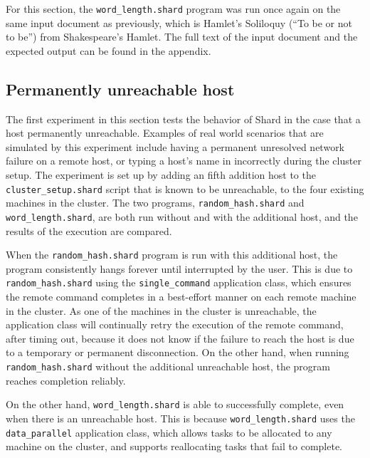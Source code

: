 \documentclass[oneside]{report}
\begin{document}
For this section, the \texttt{word\_length.shard} program was run once again on the same input document as previously, which is Hamlet's Soliloquy (``To be or not to be'') from Shakespeare's Hamlet.
The full text of the input document and the expected output can be found in the appendix.

\subsection{Permanently unreachable host}
The first experiment in this section tests the behavior of Shard in the case that a host permanently unreachable.
Examples of real world scenarios that are simulated by this experiment include having a permanent unresolved network failure on a remote host, or typing a host's name in incorrectly during the cluster setup.
The experiment is set up by adding an fifth addition host to the \texttt{cluster\_setup.shard} script that is known to be unreachable, to the four existing machines in the cluster.
The two programs, \texttt{random\_hash.shard} and \texttt{word\_length.shard}, are both run without and with the additional host, and the results of the execution are compared.

\begin{sloppypar}
  When the \texttt{random\_hash.shard} program is run with this additional host, the program consistently hangs forever until interrupted by the user.
  This is due to \texttt{random\_hash.shard} using the \texttt{single\_command} application class, which ensures the remote command completes in a best-effort manner on each remote machine in the cluster.
  As one of the machines in the cluster is unreachable, the application class will continually retry the execution of the remote command, after timing out, because it does not know if the failure to reach the host is due to a temporary or permanent disconnection.
  On the other hand, when running \texttt{random\_hash.shard} without the additional unreachable host, the program reaches completion reliably.
\end{sloppypar}

On the other hand, \texttt{word\_length.shard} is able to successfully complete, even when there is an unreachable host.
This is because \texttt{word\_length.shard} uses the \texttt{data\_parallel} application class, which allows tasks to be allocated to any machine on the cluster, and supports reallocating tasks that fail to complete.
\end{document}
